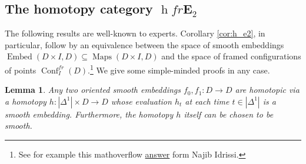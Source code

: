 \documentclass[reqno]{amsart}
\newtheorem{lemma}{Lemma}[section]
\theoremstyle{definition}
\newcommand{\opn}[1]{\operatorname{#1}}
\newcommand{\E}{\mathbf{E}}
\DeclareMathOperator{\Maps}{Maps}
\renewcommand{\1}{\mathbf{1}}
\begin{document}
\subsection{The homotopy category $\opn{h}fr\E_2$}

The following results are well-known to experts. Corollary \ref{cor:h_e2}, in particular, follow by an equivalence between the space of smooth embeddings $\opn{Embed}(D\times I,D)\subseteq \Maps(D\times I,D)$ and the space of framed configurations of points $\opn{Conf}^{fr}_I(D)$.\footnote{See for example this mathoverflow \href{https://mathoverflow.net/questions/490076/embedding-space-of-disjoint-disks-and-framed-configuration-spaces}{answer} form Najib Idrissi.} We give some simple-minded proofs in any case.

\begin{lemma}\label{lem:1430}
Any two oriented smooth embeddings $f_0,f_1:D\to D$ are homotopic via a homotopy $h:|\Delta^1|\times D\to D$ whose evaluation $h_t$ at each time $t\in |\Delta^1|$ is a smooth embedding.  Furthermore, the homotopy $h$ itself can be chosen to be smooth.
\end{lemma}
\end{document}
